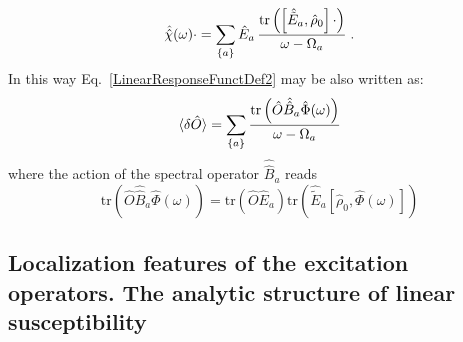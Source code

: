 \documentclass[reprint,aps,prb]{revtex4-1}
\newcommand{\be}{\begin{equation}}
\newcommand{\ee}{\end{equation}}
\newcommand{\lb}{\label}
\newcommand{\op}[1]{\hat {#1}}
\newcommand{\sop}[1]{\op{\op {#1}}}
\newcommand{\commutator}[2]{\left[ {#1} , {#2} \right]}
\newcommand{\trace}[1]{\mathrm{tr}\left(#1\right)}
\newcommand{\dmnot}{\op{\rho}_0}
\begin{document}
\be\lb{RhopExcitationDef1}
\sop{{\cal \chi}}(\omega) \cdot   = \sum_{\{a\}} \op E_{a} \,
\frac{\trace{\commutator{\op{\tilde E}_a}{\dmnot}\cdot}}{\omega-\Omega_a} \;.
\ee
In this way Eq.~\eqref{LinearResponseFunctDef2} may be also written as:
\begin{equation}\lb{deltaoexc}
  \braket{\delta \op O} =  \sum_{\{a\}} \frac{\trace{\op O \sop B_a \op \Phi(\omega)}}{\omega -\Omega_a}
\end{equation}
where the action of the spectral operator $\sop B_a$ reads
\begin{equation}
  \trace{\op O \sop B_a \op \Phi(\omega)} = \trace{\op O \op E_a}
  \trace{\op{\tilde E}_a \commutator{\dmnot}{\op \Phi(\omega)}}
\end{equation}


\subsection{Localization features of the excitation operators. The analytic structure of linear susceptibility}
\end{document}
